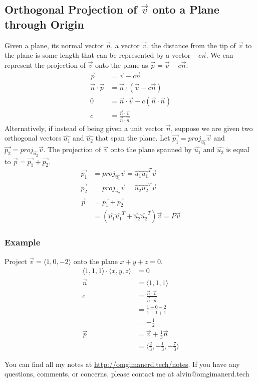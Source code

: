 \documentclass{math}
\begin{document}
\subsection*{Orthogonal Projection of \( \vec{v} \) onto a Plane through Origin}
Given a plane, its normal vector \( \vec{n} \), a vector \( \vec{v} \), the
distance from the tip of \( \vec{v} \) to the plane is some length that can be
represented by a vector \( -c\vec{n} \). We can represent the projection of
\( \vec{v} \) onto the plane as \( \vec{p} = \vec{v}-c\vec{n} \).
\begin{align*}
  \vec{p} &= \vec{v}-c\vec{n} \\
  \vec{n}\cdot\vec{p} &= \vec{n}\cdot(\vec{v}-c\vec{n}) \\
  0 &= \vec{n}\cdot\vec{v}-c(\vec{n}\cdot\vec{n}) \\
  c &= \frac{\vec{n}\cdot\vec{v}}{\vec{n}\cdot\vec{n}}
\end{align*}
Alternatively, if instead of being given a unit vector \( \vec{n} \), suppose we
are given two orthogonal vectors \( \hat{u_1} \) and \( \hat{u_2} \) that span
the plane. Let \( \vec{p_1} = proj_{\hat{u_1}}\vec{v} \) and \( \vec{p_2} =
proj_{\hat{u_2}}\vec{v} \). The projection of \( \vec{v} \) onto the plane
spanned by \( \hat{u_1} \) and \( \hat{u_2} \) is equal to \( \vec{p} =
\vec{p_1}+\vec{p_2} \).
\begin{align*}
  \vec{p_1} &= proj_{\hat{u_1}}\vec{v} = \hat{u_1}\hat{u_1}^T\vec{v} \\
  \vec{p_2} &= proj_{\hat{u_2}}\vec{v} = \hat{u_2}\hat{u_2}^T\vec{v} \\
  \vec{p} &= \vec{p_1}+\vec{p_2} \\
  &= (\hat{u_1}\hat{u_1}^T+\hat{u_2}\hat{u_2}^T)\vec{v} = P\vec{v}
\end{align*}

\subsubsection*{Example}
Project \( \vec{v} = \langle1,0,-2\rangle \) onto the plane \( x+y+z = 0 \).
\begin{align*}
  \langle1,1,1\rangle\cdot\langle x,y,z\rangle &= 0 \\
  \vec{n} &= \langle1,1,1\rangle \\
  c &= \frac{\vec{n}\cdot\vec{v}}{\vec{n}\cdot\vec{n}} \\
  &= \frac{1+0-2}{1+1+1} \\
  &= -\frac{1}{2} \\
  \vec{p} &= \vec{v}+\frac{1}{3}\vec{n} \\
  &= \langle\frac{2}{3},-\frac{1}{3},-\frac{7}{3}\rangle
\end{align*}

\begin{center}
  You can find all my notes at \url{http://omgimanerd.tech/notes}. If you have
  any questions, comments, or concerns, please contact me at
  alvin@omgimanerd.tech
\end{center}
\end{document}
